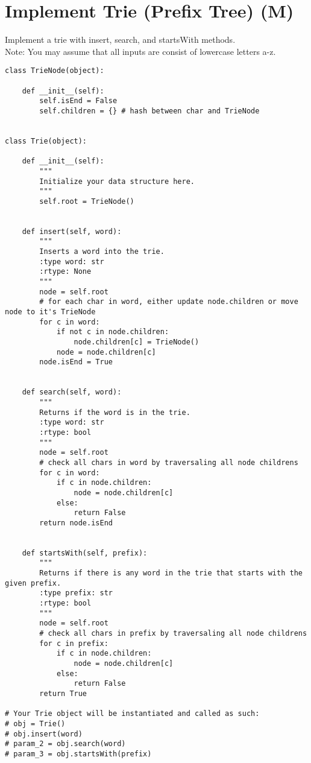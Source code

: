 \section{Implement Trie (Prefix Tree) (M)}
Implement a trie with insert, search, and startsWith methods.\\

Note:
You may assume that all inputs are consist of lowercase letters a-z. \\

\begin{lstlisting}
class TrieNode(object):
    
    def __init__(self):
        self.isEnd = False
        self.children = {} # hash between char and TrieNode 
        
        
class Trie(object):

    def __init__(self):
        """
        Initialize your data structure here.
        """
        self.root = TrieNode()
        

    def insert(self, word):
        """
        Inserts a word into the trie.
        :type word: str
        :rtype: None
        """
        node = self.root
        # for each char in word, either update node.children or move node to it's TrieNode
        for c in word:
            if not c in node.children:
                node.children[c] = TrieNode()
            node = node.children[c]
        node.isEnd = True
        

    def search(self, word):
        """
        Returns if the word is in the trie.
        :type word: str
        :rtype: bool
        """
        node = self.root
        # check all chars in word by traversaling all node childrens
        for c in word:
            if c in node.children:
                node = node.children[c]
            else:
                return False
        return node.isEnd
        

    def startsWith(self, prefix):
        """
        Returns if there is any word in the trie that starts with the given prefix.
        :type prefix: str
        :rtype: bool
        """
        node = self.root
        # check all chars in prefix by traversaling all node childrens
        for c in prefix:
            if c in node.children:
                node = node.children[c]
            else:
                return False
        return True
        
# Your Trie object will be instantiated and called as such:
# obj = Trie()
# obj.insert(word)
# param_2 = obj.search(word)
# param_3 = obj.startsWith(prefix)
\end{lstlisting}

